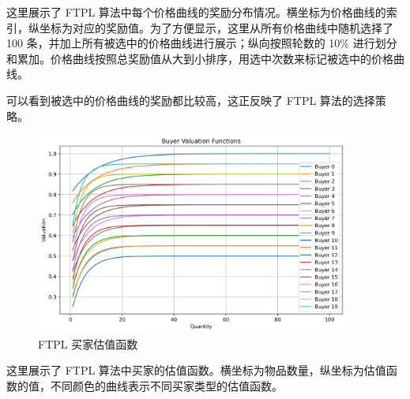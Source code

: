 这里展示了 FTPL 算法中每个价格曲线的奖励分布情况。横坐标为价格曲线的索引，纵坐标为对应的奖励值。为了方便显示，这里从所有价格曲线中随机选择了 100 条，并加上所有被选中的价格曲线进行展示；纵向按照轮数的 10\% 进行划分和累加。价格曲线按照总奖励值从大到小排序，用选中次数来标记被选中的价格曲线。

可以看到被选中的价格曲线的奖励都比较高，这正反映了 FTPL 算法的选择策略。

\begin{figure}[H]
    \centering
    \includegraphics[width=0.92\textwidth]{figures/FTPL_valuation_functions}
    \caption{FTPL 买家估值函数}
\end{figure}

这里展示了 FTPL 算法中买家的估值函数。横坐标为物品数量，纵坐标为估值函数的值，不同颜色的曲线表示不同买家类型的估值函数。